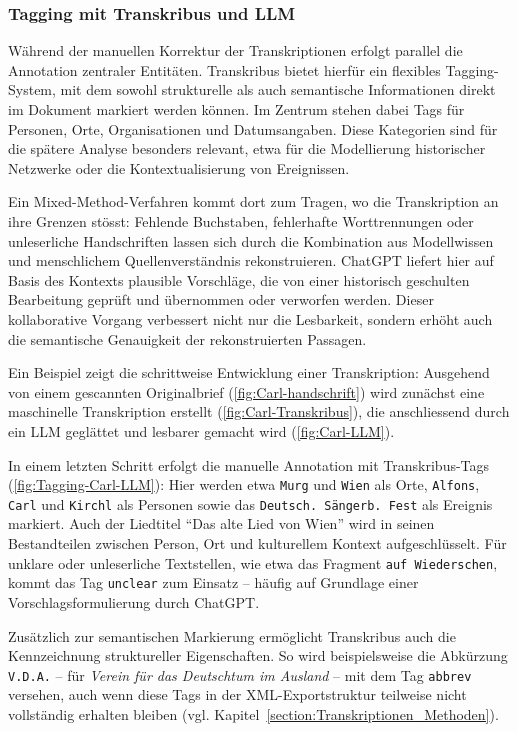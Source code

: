 \documentclass[12pt, a4paper, ngerman, bidi=default]{article}
\begin{document}
\subsubsection{Tagging mit Transkribus und LLM}

Während der manuellen Korrektur der Transkriptionen erfolgt parallel die Annotation zentraler Entitäten. 
Transkribus bietet hierfür ein flexibles Tagging-System, mit dem sowohl strukturelle als auch semantische Informationen direkt im Dokument markiert werden können. 
Im Zentrum stehen dabei Tags für Personen, Orte, Organisationen und Datumsangaben. Diese Kategorien sind für die spätere Analyse besonders relevant, 
etwa für die Modellierung historischer Netzwerke oder die Kontextualisierung von Ereignissen.

Ein Mixed-Method-Verfahren kommt dort zum Tragen, wo die Transkription an ihre Grenzen stösst: 
Fehlende Buchstaben, fehlerhafte Worttrennungen oder unleserliche Handschriften lassen sich durch die Kombination aus Modellwissen 
und menschlichem Quellenverständnis rekonstruieren. ChatGPT liefert hier auf Basis des Kontexts plausible Vorschläge, 
die von einer historisch geschulten Bearbeitung geprüft und übernommen oder verworfen werden. Dieser kollaborative Vorgang verbessert 
nicht nur die Lesbarkeit, sondern erhöht auch die semantische Genauigkeit der rekonstruierten Passagen.

Ein Beispiel zeigt die schrittweise Entwicklung einer Transkription: Ausgehend von einem gescannten Originalbrief (\autoref{fig:Carl-handschrift}) 
wird zunächst eine maschinelle Transkription erstellt (\autoref{fig:Carl-Transkribus}), die anschliessend durch ein LLM geglättet und lesbarer gemacht wird 
(\autoref{fig:Carl-LLM}).

In einem letzten Schritt erfolgt die manuelle Annotation mit Transkribus-Tags (\autoref{fig:Tagging-Carl-LLM}): 
Hier werden etwa \texttt{Murg} und \texttt{Wien} als Orte, \texttt{Alfons}, \texttt{Carl} und \texttt{Kirchl} als Personen sowie das 
\texttt{Deutsch. Sängerb. Fest} als Ereignis markiert. Auch der Liedtitel \enquote{Das alte Lied von Wien} wird in seinen Bestandteilen 
zwischen Person, Ort und kulturellem Kontext aufgeschlüsselt. Für unklare oder unleserliche Textstellen, wie etwa das Fragment \texttt{auf Wiederschen}, 
kommt das Tag \texttt{unclear} zum Einsatz – häufig auf Grundlage einer Vorschlagsformulierung durch ChatGPT.

Zusätzlich zur semantischen Markierung ermöglicht Transkribus auch die Kennzeichnung struktureller Eigenschaften. 
So wird beispielsweise die Abkürzung \texttt{V.D.A.} – für \textit{Verein für das Deutschtum im Ausland} – mit dem Tag \texttt{abbrev} versehen, 
auch wenn diese Tags in der XML-Exportstruktur teilweise nicht vollständig erhalten bleiben (vgl. Kapitel~\ref{section:Transkriptionen_Methoden}).
\end{document}
